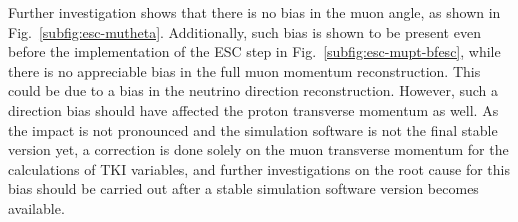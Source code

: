      Further investigation shows that there is no bias in the muon angle, as shown in Fig.~\ref{subfig:esc-mutheta}.
     Additionally, such bias is shown to be present even before the implementation of the ESC step in Fig.~\ref{subfig:esc-mupt-bfesc}, while there is no appreciable bias in the full muon momentum reconstruction.
     This could be due to a bias in the neutrino direction reconstruction.
     However, such a direction bias should have affected the proton transverse momentum as well.
     As the impact is not pronounced and the simulation software is not the final stable version yet, a correction is done solely on the muon transverse momentum for the calculations of TKI variables, and further investigations on the root cause for this bias should be carried out after a stable simulation software version becomes available.

